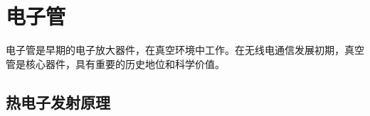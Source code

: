 
\section{电子管}
\label{sec:vacuum_tubes}

电子管是早期的电子放大器件，在真空环境中工作。在无线电通信发展初期，真空管是核心器件，具有重要的历史地位和科学价值。

\subsection{热电子发射原理}
\label{sec:thermionic_emission}

